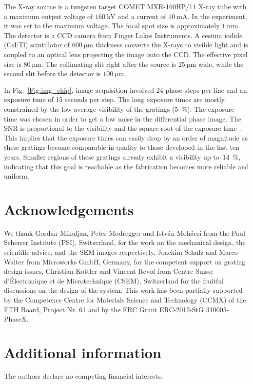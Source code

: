 \documentclass[english]{nature}
\begin{document}
The X-ray source is a tungsten target COMET MXR-160HP/11 X-ray tube with a maximum output
voltage of $\SI{160}{\kilo\volt}$ and a current of $\SI{10}{\milli\ampere}$. In the experiment, it was set to the
maximum voltage. The focal spot size is approximately
$\SI{1}{\milli\metre}$. The detector is a CCD camera from Finger Lakes
Instruments. A cesium iodide (CsI:Tl) scintillator of $\SI{600}{\micro
\metre}$ thickness converts the X-rays to visible light and is coupled to
an optical lens projecting the image onto the CCD\@. The effective pixel size
is $\SI{80}{\micro\metre}$. The collimating slit right after the source is 
$\SI{25}{\micro\metre}$ wide, while the second slit before the detector is
$\SI{100}{\micro\metre}$.

In Fig.~\ref{Fig:img_chip}, image acquisition involved 24 phase steps per
line and an exposure time of 15 seconds per step. The long
exposure times are mostly constrained by the low average visibility of the
gratings (\SI{5}{\percent}). The exposure time was chosen in order to
get a low noise in the differential phase image. The \ac{SNR} is
proportional to the visibility and the square root of the exposure
time~\cite{Raupach2011}.
This implies that the exposure times can easily drop by an order of
magnitude as these gratings become comparable in quality to those developed
in the last ten years. 
Smaller regions of these gratings already exhibit a visibility up
to~\SI{14}{\percent}, indicating that this goal is reachable as the
fabrication becomes more reliable and uniform.

\section*{Acknowledgements}
We thank Gordan Mikuljan, Peter Modregger and István Mohácsi from the Paul
Scherrer Institute (PSI), Switzerland, for the
work on the mechanical design, the scientific advice, and the \ac{SEM} images
respectively, Joachim Schulz and Marco Walter from
Microworks GmbH, Germany, for the competent support on grating design
issues, Christian Kottler and Vincent Revol from Centre Suisse
d'\'Electronique et de Microtechnique (CSEM), Switzerland for the fruitful
discussions on the design of the system. This work has been partially
supported by the Competence Centre for Materials Science and Technology
(CCMX) of the ETH Board, Project Nr. 61 and by the ERC Grant ERC-2012-StG 310005-PhaseX.

\section*{Additional information}
The authors declare no competing financial interests.
\end{document}
